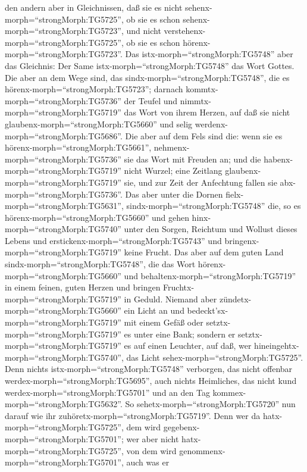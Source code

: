 den andern aber in Gleichnissen, daß sie es nicht
sehenx-morph=``strongMorph:TG5725'', ob sie es schon
sehenx-morph=``strongMorph:TG5723'', und nicht
verstehenx-morph=``strongMorph:TG5725'', ob sie es schon
hörenx-morph=``strongMorph:TG5723''.  Das
istx-morph=``strongMorph:TG5748'' aber das Gleichnis: Der Same
istx-morph=``strongMorph:TG5748'' das Wort Gottes.  Die
aber an dem Wege sind, das sindx-morph=``strongMorph:TG5748'', die es
hörenx-morph=``strongMorph:TG5723''; darnach
kommtx-morph=``strongMorph:TG5736'' der Teufel und
nimmtx-morph=``strongMorph:TG5719'' das Wort von ihrem Herzen, auf daß
sie nicht glaubenx-morph=``strongMorph:TG5660'' und selig
werdenx-morph=``strongMorph:TG5686''.  Die aber auf dem
Fels sind die: wenn sie es hörenx-morph=``strongMorph:TG5661'',
nehmenx-morph=``strongMorph:TG5736'' sie das Wort mit Freuden an; und
die habenx-morph=``strongMorph:TG5719'' nicht Wurzel; eine Zeitlang
glaubenx-morph=``strongMorph:TG5719'' sie, und zur Zeit der Anfechtung
fallen sie abx-morph=``strongMorph:TG5736''.  Das aber
unter die Dornen fielx-morph=``strongMorph:TG5631'',
sindx-morph=``strongMorph:TG5748'' die, so es
hörenx-morph=``strongMorph:TG5660'' und gehen
hinx-morph=``strongMorph:TG5740'' unter den Sorgen, Reichtum und Wollust
dieses Lebens und erstickenx-morph=``strongMorph:TG5743'' und
bringenx-morph=``strongMorph:TG5719'' keine Frucht.  Das
aber auf dem guten Land sindx-morph=``strongMorph:TG5748'', die das Wort
hörenx-morph=``strongMorph:TG5660'' und
behaltenx-morph=``strongMorph:TG5719'' in einem feinen, guten Herzen und
bringen Fruchtx-morph=``strongMorph:TG5719'' in Geduld. 
Niemand aber zündetx-morph=``strongMorph:TG5660'' ein Licht an und
bedeckt'sx-morph=``strongMorph:TG5719'' mit einem Gefäß oder
setztx-morph=``strongMorph:TG5719'' es unter eine Bank; sondern er
setztx-morph=``strongMorph:TG5719'' es auf einen Leuchter, auf daß, wer
hineingehtx-morph=``strongMorph:TG5740'', das Licht
sehex-morph=``strongMorph:TG5725''.  Denn nichts
istx-morph=``strongMorph:TG5748'' verborgen, das nicht offenbar
werdex-morph=``strongMorph:TG5695'', auch nichts Heimliches, das nicht
kund werdex-morph=``strongMorph:TG5701'' und an den Tag
kommex-morph=``strongMorph:TG5632''.  So
sehetx-morph=``strongMorph:TG5720'' nun darauf wie ihr
zuhöretx-morph=``strongMorph:TG5719''. Denn wer da
hatx-morph=``strongMorph:TG5725'', dem wird
gegebenx-morph=``strongMorph:TG5701''; wer aber nicht
hatx-morph=``strongMorph:TG5725'', von dem wird
genommenx-morph=``strongMorph:TG5701'', auch was er
